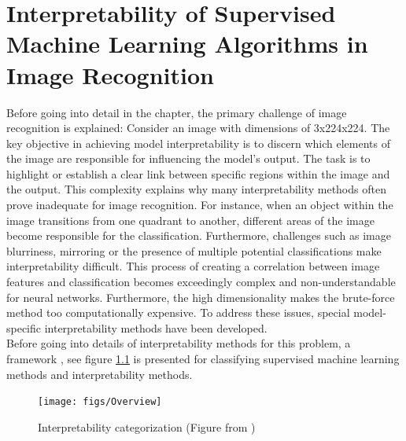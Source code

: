 \chapter{Interpretability of Supervised Machine Learning Algorithms in Image Recognition}
\label{sec:IoNN}

Before going into detail in the chapter, the primary challenge of image recognition is explained: Consider an image with dimensions of 3x224x224. The key objective in achieving model interpretability is to discern which elements of the image are responsible for influencing the model's output. The task is to highlight or establish a clear link between specific regions within the image and the output. This complexity explains why many interpretability methods often prove inadequate for image recognition. For instance, when an object within the image transitions from one quadrant to another, different areas of the image become responsible for the classification. Furthermore, challenges such as image blurriness, mirroring or the presence of multiple potential classifications make interpretability difficult. This process of creating a correlation between image features and classification becomes exceedingly complex and non-understandable for neural networks. Furthermore, the high dimensionality makes the brute-force method too computationally expensive. To address these issues, special model-specific interpretability methods have been developed.\\

Before going into details of interpretability methods for this problem, a framework \cite{allen2023interpretable}, see figure \ref{fig:IML_Overview} is presented for classifying supervised machine learning methods and interpretability methods.

\begin{figure}[H]
	\centering
	\texttt{[image: figs/Overview]}
	\caption[Interpretability categorization ]{Interpretability categorization (Figure from \cite{allen2023interpretable})}
	\label{fig:IML_Overview}
\end{figure}

